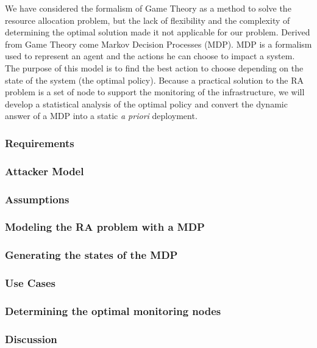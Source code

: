 We have considered the formalism of Game Theory as a method to solve the resource allocation problem, but the lack of flexibility and the complexity of determining the optimal solution made it not applicable for our problem. Derived from Game Theory come Markov Decision Processes (MDP).
MDP is a formalism used to represent an agent and the actions he can choose to impact a system. The purpose of this model is to find the best action to choose depending on the state of the system (\ie the optimal policy). Because a practical solution to the RA problem is a set of node to support the monitoring of the infrastructure, we will develop a statistical analysis of the optimal policy and convert the dynamic answer of a MDP into a static \textit{a priori} deployment.

\subsubsection{Requirements}




\subsubsection{Attacker Model}


\subsubsection{Assumptions}


\subsubsection{Modeling the RA problem with a MDP}


\subsubsection{Generating the states of the MDP}
 

\subsubsection{Use Cases}


\subsubsection{Determining the optimal monitoring nodes}


\subsubsection{Discussion}
